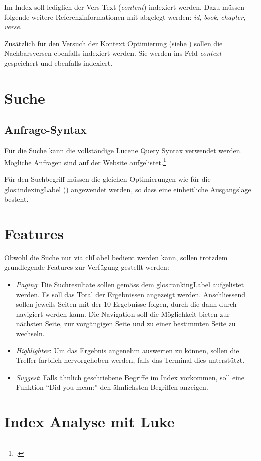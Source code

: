 Im Index soll lediglich der Vers-Text (\textit{content}) indexiert werden.
Dazu müssen folgende weitere Referenzinformationen mit abgelegt werden: \textit{id}, \textit{book}, \textit{chapter}, \textit{verse}.

Zusätzlich für den Versuch der Kontext Optimierung (siehe ) sollen die Nachbarsversen ebenfalls indexiert werden. Sie werden ins Feld \textit{context} gespeichert und ebenfalls indexiert.


\section{Suche}
\subsection{Anfrage-Syntax}
Für die Suche kann die vollständige Lucene Query Syntax verwendet werden. Mögliche Anfragen sind auf der Website aufgelistet.\footcite{Lucene_Query_Syntax_Lucene_Tutorial_2016-05-09}

Für den Suchbegriff müssen die gleichen Optimierungen wie für die \gls{glos:indexingLabel} () angewendet werden, so dass eine einheitliche Ausgangslage besteht.

\section{Features}
Obwohl die Suche nur via \gls{cliLabel} bedient werden kann, sollen trotzdem grundlegende Features zur Verfügung gestellt werden:
\begin{itemize}
	\item \textit{Paging}:
	Die Suchresultate sollen gemäss dem \gls{glos:rankingLabel} aufgelistet werden. Es soll das Total der Ergebnissen angezeigt werden. Anschliessend sollen jeweils Seiten mit der 10 Ergebnisse folgen, durch die dann durch navigiert werden kann.
	Die Navigation soll die Möglichkeit bieten zur nächsten Seite, zur vorgängigen Seite und zu einer bestimmten Seite zu wechseln.
	
	\item \textit{Highlighter}:
	Um das Ergebnis angenehm auswerten zu können, sollen die Treffer farblich hervorgehoben werden, falls das Terminal dies unterstützt.

	\item \textit{Suggest}:
	Falls ähnlich geschriebene Begriffe im Index vorkommen, soll eine Funktion "`Did you mean:"' den ähnlichsten Begriffen anzeigen.
	
	
\end{itemize}

\section{Index Analyse mit Luke}
